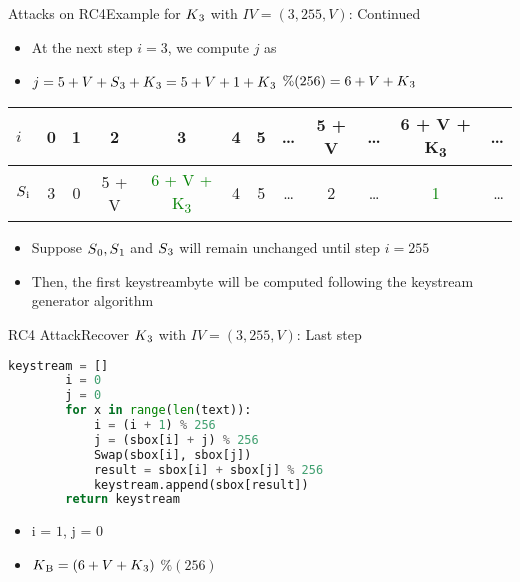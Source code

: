 \documentclass[
	aspectratio=169,	%
	onlytextwidth,		%
	t					%
	]{beamer}
\begin{document}
\begin{frame}[fragile]{Attacks on RC4}{Example for $K\textsubscript{3}$ with $IV=(3,255,V)$: Continued}

	
	\begin{itemize}
		\item At the next step $i = 3$, we compute $j$ as
		\item $j = 5 + V + S\textsubscript{3} + K\textsubscript{3} = 5 + V + 1 + K\textsubscript{3}$ $\%(256) = 6 + V + K\textsubscript{3}$
	\end{itemize}
	
	\begin{table}[h!]
		\begin{center}
			\begin{tabular}{l|c|c|c|c|c|c|c|c|c|c|r}
			$i$ & 0 & 1 & 2 & 3 & 4 & 5 & \dots & 5 + V & \dots & 6 + V + K\textsubscript{3} & \dots\\
			\hline
			$S\textsubscript{i}$ & 3 & 0 & 5 + V & \textcolor{green}{6 + V + K\textsubscript{3}} & 4 & 5 & \dots & 2 & \dots & \textcolor{green}{1} & \dots\\
			\end{tabular}
		\end{center}
	\end{table}

	\begin{itemize}
		\item Suppose $S\textsubscript{0}, S\textsubscript{1}$ and $S\textsubscript{3}$ will remain unchanged until step $i = 255$
		\item Then, the first keystreambyte will be computed following the keystream generator algorithm
	\end{itemize}
\end{frame}

\begin{frame}[fragile]{RC4 Attack}{Recover $K\textsubscript{3}$ with $IV=(3,255,V)$: Last step}

	\begin{lstlisting}[language=Python]
		keystream = []
		i = 0
		j = 0
		for x in range(len(text)):
			i = (i + 1) % 256
			j = (sbox[i] + j) % 256
			Swap(sbox[i], sbox[j])
			result = sbox[i] + sbox[j] % 256
			keystream.append(sbox[result])   
		return keystream   
	\end{lstlisting}
	\begin{itemize}
		\item i = $1$, j = $0$
		\item $K\textsubscript{B} = (6 + V + K\textsubscript{3})$ $\% (256)$
	\end{itemize}

\end{frame}
\end{document}
